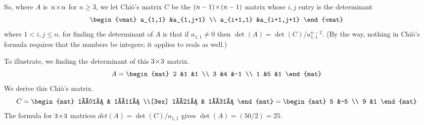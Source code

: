 So, where $A$ is~$\nbyn{n}$ for $n\geq 3$, we let Chi\`o's matrix $C$ be the
$\nbyn{(n-1)}$ matrix whose $i,j$ entry is the determinant
\begin{equation*}
  \begin{vmat}
    a_{1,1}  &a_{1,j+1} \\
    a_{i+1,1}    &a_{i+1,j+1}
  \end{vmat}
\end{equation*}
where $1<i,j\leq n$.
for finding the determinant of $A$ is that
if $a_{1,1}\neq 0$ then
$\det(A)=\det(C)/a_{1,1}^{n-2}$.
(By the way,
nothing in Chi\`o's formula requires that the numbers be integers; it applies
to reals as well.)

To illustrate, we  finding the determinant of this $\nbyn{3}$ matrix.
\begin{equation*} 
  A=
  \begin{mat}
    2 &1 &1 \\
    3 &4 &-1 \\
    1 &5 &1 
  \end{mat}
\end{equation*}
We derive this Chi\`o's matrix.
\begin{equation*}
  C=
  \begin{mat}
    \begin{vmat}
      2 &1 \\
      3 &4
    \end{vmat}
   &
   \begin{vmat}
     2 &1 \\
     3 &-1
   \end{vmat}        \\[3ex]      
   \begin{vmat}
     2 &1 \\
     1 &5
   \end{vmat}
   &
   \begin{vmat}
     2 &1 \\
     1 &1
   \end{vmat}
  \end{mat}
  =
  \begin{mat}
    5  &-5  \\
    9  &1
  \end{mat}
\end{equation*}
The formula for $\nbyn{3}$ matrices
$det(A)=\det(C)/a_{1,1}$ gives $\det(A)=(50/2)=25$.

